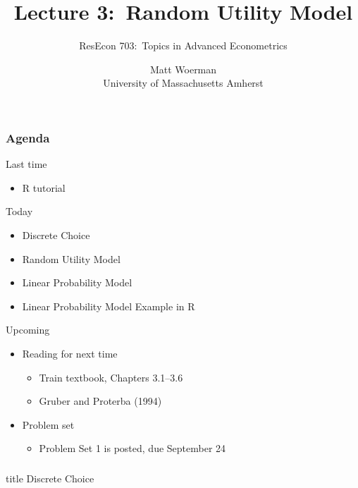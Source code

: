\documentclass{beamer}\usepackage[]{graphicx}\usepackage[]{color}
\title[Lecture 3:\ Random Utility Model]{Lecture 3:\ Random Utility Model}
\author[ResEcon 703:\ Advanced Econometrics]{ResEcon 703:\ Topics in Advanced Econometrics}
\date{Matt Woerman\\University of Massachusetts Amherst}
\begin{document}
{ 
\begin{frame}[noframenumbering]
    \titlepage
\end{frame}
}

\begin{frame}\frametitle{Agenda}
    Last time
    \begin{itemize}
        \item R tutorial
    \end{itemize}
    \vspace{2ex}
    Today
    \begin{itemize}
    	\item Discrete Choice
        \item Random Utility Model
        \item Linear Probability Model
        \item Linear Probability Model Example in R
    \end{itemize}
    \vspace{2ex}
    Upcoming
    \begin{itemize}
        \item Reading for next time
        \begin{itemize}
            \item Train textbook, Chapters 3.1--3.6
            \item Gruber and Proterba (1994)
        \end{itemize}
        \item Problem set
        \begin{itemize}
            \item Problem Set 1 is posted, due September 24
        \end{itemize}
    \end{itemize}
\end{frame}

\begin{frame}\frametitle{}
    \vfill
    \centering
    \begin{beamercolorbox}[center]{title}
        \Large Discrete Choice
    \end{beamercolorbox}
    \vfill
\end{frame}
\end{document}
